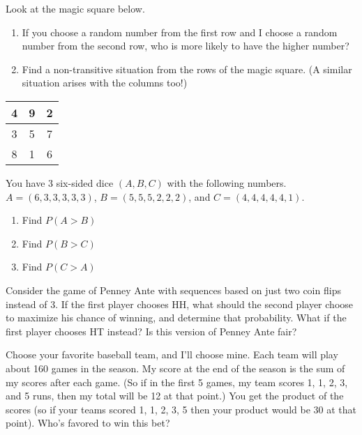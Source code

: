 \documentclass[12pt,letterpaper]{hmcpset}
\begin{document}

\begin{problem}[1]
  Look at the magic square below.
  \begin{enumerate}[label=(\alph*)]
  \item If you choose a random number from the first row and I choose a random number from the second row, who is more likely to have the higher number?
  \item Find a non-transitive situation from the rows of the magic square. (A similar situation arises with the columns too!)
  \end{enumerate}
  \centering
  \begin{tabular}{|c|c|c|}
    \hline
    4 & 9 & 2 \\ \hline
    3 & 5 & 7 \\ \hline
    8 & 1 & 6 \\ \hline
  \end{tabular}
\end{problem}
\begin{solution}
\end{solution}
\pagebreak

\begin{problem}[2]
  You have 3 six-sided dice $(A, B, C)$ with the following numbers. $A = (6,3,3,3,3,3)$, $B = (5,5,5,2,2,2)$, and $C = (4,4,4,4,4,1)$.
  \begin{enumerate}[label=(\alph*)]
  \item Find $P(A>B)$
  \item Find $P(B>C)$
  \item Find $P(C>A)$
  \end{enumerate}
\end{problem}
\begin{solution}
\end{solution}
\pagebreak

\begin{problem}[3]
Consider the game of Penney Ante with sequences based on just two coin flips instead of 3. If the first player chooses HH, what should the second player choose to maximize his chance of winning, and determine that probability. What if the first player chooses HT instead? Is this version of Penney Ante fair?
\end{problem}
\begin{solution}
\end{solution}
\pagebreak

\begin{problem}[4]
Choose your favorite baseball team, and I’ll choose mine. Each team will play about 160 games in the season. My score at the end of the season is the sum of my scores after each game. (So if in the first 5 games, my team scores 1, 1, 2, 3, and 5 runs, then my total will be 12 at that point.) You get the product of the scores (so if your teams scored 1, 1, 2, 3, 5 then your product would be 30 at that point). Who's favored to win this bet?
\end{problem}
\begin{solution}

\end{solution}
\end{document}

